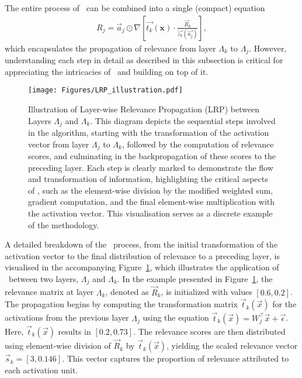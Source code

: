 The entire process of \LRP\ can  be combined into a single (compact) equation
\begin{eqnarray*}
R_{j}= \vec{a}_{j} \odot \nabla\left [\vec{t_{k}}(\boldsymbol{x}) \cdot \frac{\vec{R}_k}{\vec{z_k}(\vec{a_j})}\right],
\end{eqnarray*}
which encapsulates the propagation of relevance from layer $\Lambda_k$ to $\Lambda_j$. However, understanding each step in detail as described in this subsection is critical for appreciating the intricacies of \LRP\ and building on top of it. 


\begin{figure}[ht!]
\begin{center}
\texttt{[image: Figures/LRP\_illustration.pdf]}
\end{center}
\caption{Illustration of Layer-wise Relevance Propagation (LRP) between Layers $\Lambda_j$ and $\Lambda_k$. This diagram depicts the sequential steps involved in the \LRP\/ algorithm, starting with the transformation of the activation vector from layer $\Lambda_j$ to $\Lambda_k$, followed by the computation of relevance scores, and culminating in the backpropagation of these scores to the preceding layer. Each step is clearly marked to demonstrate the flow and transformation of information, highlighting the critical aspects of \LRP\/, such as the element-wise division by the modified weighted sum, gradient computation, and the final element-wise multiplication with the activation vector. This visualisation serves as a discrete example of the methodology.}
\label{Fig:LRP_breakdown}
\end{figure} 


A detailed breakdown of the \LRP\ process, from the initial transformation of the activation vector to the final distribution of relevance to a preceding layer, is visualised in the accompanying Figure~\ref{Fig:LRP_breakdown}, which illustrates the application of \LRP\ between two layers, $\Lambda_j$ and $\Lambda_k$. In the example presented in Figure~\ref{Fig:LRP_breakdown}, the relevance matrix at layer \(\Lambda_k\), denoted as \(\vec{R}_k\), is initialized with values \([0.6, 0.2]\). The propagation begins by computing the transformation matrix \(\vec{t}_k(\vec{x})\) for the activations from the previous layer \(\Lambda_j\) using the equation \(\vec{t}_k(\vec{x}) = W_j^\intercal \vec{x} + \vec{\epsilon}\). Here, \(\vec{t}_k(\vec{x})\) results in \([0.2, 0.73]\). The relevance scores are then distributed using element-wise division of \(\vec{R}_k\) by \(\vec{t}_k(\vec{x})\), yielding the scaled relevance vector \(\vec{s}_k = [3, 0.146]\). This vector captures the proportion of relevance attributed to each activation unit. 

